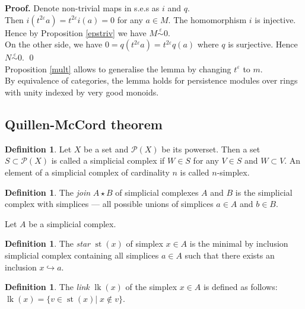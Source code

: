\documentclass[english,12pt]{article}
\newcounter{stmcounter}[section]
\numberwithin{equation}{section}
\theoremstyle{definition}
\newtheorem{definition}[stmcounter]{Definition}
\theoremstyle{remark}
\newenvironment{pf}{\noindent\textbf{Proof.}}{\qed}
\newcommand{\define}[1]{{\textit{#1}}}
\begin{document}
\begin{pf}
  Denote non-trivial maps in s.e.s as $i$ and $q$.\\

  Then $i(t^{2\varepsilon}a) = t^{2\varepsilon}i(a) = 0$ for any $a \in M$. The homomorphism $i$ is injective. Hence by Proposition \ref{epstriv} we have $M \stackrel{\varepsilon}{\sim} 0$.\\

  On the other side, we have $0 = q(t^{2\varepsilon}a) = t^{2\varepsilon}q(a)$ where $q$ is surjective. Hence $N \stackrel{\varepsilon}{\sim} 0$.
\end{pf}\\

Proposition \ref{mult} allows to generalise the lemma by changing $t^{\varepsilon}$ to $m$.\\

By equivalence of categories, the lemma holds for persistence modules over rings with unity indexed by very good monoids.

\subsection{Quillen-McCord theorem}

\begin{definition}
  Let $X$ be a set and $\mathcal{P}(X)$ be its powerset. Then a set $S \subset \mathcal{P}(X)$ is called a simplicial complex if $W \in S$ for any $V \in S$ and $W \subset V$. An element of a simplicial complex of cardinality $n$ is called $n$-simplex.
\end{definition}

\begin{definition}
  The \define{join} $A \star B$ of simplicial complexes $A$ and $B$ is the simplicial complex with simplices --- all possible unions of simplices $a \in A$ and $b \in B$.
\end{definition}

Let $A$ be a simplicial complex.

\begin{definition}
  The \define{star} $\operatorname{st}(x)$ of simplex $x \in A$ is the minimal by inclusion simplicial complex containing all simplices $a \in A$ such that there exists an inclusion $x \hookrightarrow a$.
\end{definition}

\begin{definition}
  The \define{link} $\operatorname{lk}(x)$ of the simplex $x \in A$ is defined as follows: $\operatorname{lk}(x) = \{v \in \operatorname{st}(x)|\; x \not\in v\}$.
\end{definition}
\end{document}
